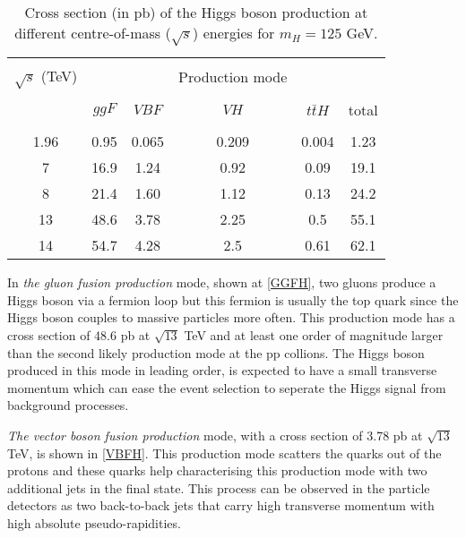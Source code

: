 \begin{table*}[ht]
	{\setlength{\tabcolsep}{14pt}
		\caption{Cross section (in pb) of the Higgs boson production at different centre-of-mass ($\sqrt{s}$) energies for $m_H=125$ GeV.}
		\begin{center}
			\vspace{-6mm}
			\begin{tabular}{cccccc}
				\hline \\[-2.45ex] \hline \\[-2.1ex]
				$\sqrt{s}$ (TeV) &&&Production mode&&\\
				\hline \\[-1.8ex]
				& $ggF$ & $VBF$ & $VH$ & $t\bar tH$ & total \\
				\hline \\[-1.8ex]
                1.96 & 0.95 & 0.065 & 0.209 & 0.004 & 1.23 \\
                7 & 16.9 & 1.24 & 0.92 & 0.09 & 19.1 \\
                8 & 21.4 & 1.60 & 1.12 & 0.13 & 24.2 \\
                13 & 48.6 & 3.78 & 2.25 & 0.5 & 55.1 \\
                14 & 54.7 & 4.28 & 2.5 & 0.61 & 62.1 \\
				\hline
			\end{tabular}
			\vspace{-6mm}
		\end{center}
		\label{HiggsxsecTable}}
\end{table*}

In \emph{the gluon fusion production} mode, shown at \autoref{GGFH}, two gluons produce a Higgs boson via a fermion loop but this fermion is usually the top quark since the Higgs boson couples to massive particles more often. This production mode has a cross section of 48.6 pb at $\sqrt{13}$ TeV and at least one order of magnitude larger than the second likely production mode at the pp collions. The Higgs boson produced in this mode in leading order, is expected to have a small transverse momentum which can ease the event selection to seperate the Higgs signal from background processes. 

\emph{The vector boson fusion production} mode, with a cross section of 3.78 pb at $\sqrt{13}$ TeV, is shown in \autoref{VBFH}. This production mode scatters the quarks out of the protons and these quarks help characterising this production mode with two additional jets in the final state. This process can be observed in the particle detectors as two back-to-back jets that carry high transverse momentum with high absolute pseudo-rapidities.

